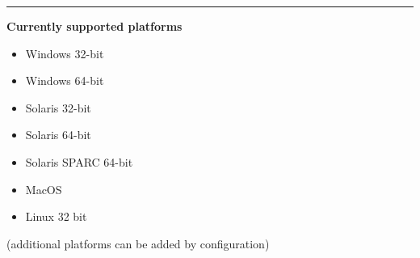 \documentclass[A4paper,10pt,english]{sphinxmanual}
\begin{document}
\bigskip\hrule{}\bigskip


\textbf{Currently supported platforms}
\begin{itemize}
\item {} 
Windows 32-bit

\item {} 
Windows 64-bit

\item {} 
Solaris 32-bit

\item {} 
Solaris 64-bit

\item {} 
Solaris SPARC 64-bit

\item {} 
MacOS

\item {} 
Linux 32 bit

\end{itemize}

(additional platforms can be added by configuration)

\renewcommand{\indexname}{Index}
\end{document}
